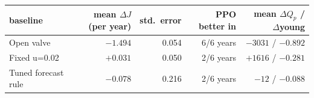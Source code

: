 \begin{tabular}{lrrrr}
\toprule
baseline & mean $\Delta J$ (per year) & std.\ error & PPO better in & mean $\Delta Q_p$ / $\Delta$young \\
\midrule
Open valve & $-1.494$ & 0.054 & 6/6 years & $-3031$ / $-0.892$ \\
Fixed u=0.02 & $+0.031$ & 0.050 & 2/6 years & $+1616$ / $-0.281$ \\
Tuned forecast rule & $-0.078$ & 0.216 & 2/6 years & $-12$ / $-0.088$ \\
\bottomrule
\end{tabular}
